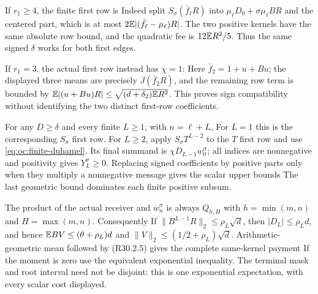 If $r_1\ge4$, the finite first row is
Indeed split $S_\sigma(\bar f_\ell R)$ into
$\mu_\ell D_0+\sigma\mu_\ell BR$ and the centered part, which is
at most $2\mathbb E| (\bar f_\ell-\mu_\ell)R|$. The two positive kernels
have the same absolute row bound, and the quadratic fee is
$12\mathbb E R^2/5$. Thus the same signed $\delta$ works for both first
edges.

If $r_1=3$, the actual first row instead has $\chi=1$:
Here $\bar f_2=1+u+Bu$; the displayed three means are precisely
$J(\bar f_2R)$, and the remaining row term is bounded by
$\mathbb E|(u+Bu)R|\le\sqrt{(d+\delta_2)\mathbb E R^2}$.
This proves sign compatibility without identifying the two distinct
first-row coefficients.

For any $D\ge\delta$ and every finite $L\ge1$, with $n=\ell+L$,
For $L=1$ this is the corresponding $S_\sigma$ first row. For $L\ge2$,
apply $S_\sigma T^{L-2}$ to the $T$ first row and use
\eqref{eq:oc:finite-duhamel}. Its final summand is
$\chi D_{L-1}w_0^\sigma$; all indices are nonnegative and positivity gives
$Y_L^\sigma\ge0$.
Replacing signed coefficients by positive parts only when they
multiply a nonnegative message gives the scalar upper bounds
The last geometric bound dominates each finite positive subsum.

The product of the actual receiver and $w_n^\sigma$ is always
$Q_{h,H}$ with $h=\min(m,n)$ and $H=\max(m,n)$.
Consequently
If $\|B^{L-1}R\|_2\le\rho_L\sqrt d$, then
$|D_L|\le\rho_Ld$, and hence
$\mathbb E BV\le(\theta+\rho_L)d$ and
$\|V\|_2\le(1/2+\rho_L)\sqrt d$.
Arithmetic-geometric mean followed by (R30.2.5) gives the complete
same-kernel payment
If the moment is zero use the equivalent exponential inequality.
The terminal mask and root interval need not be disjoint: this is one
exponential expectation, with every scalar cost displayed.

